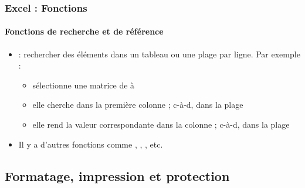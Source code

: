 \documentclass[xcolor=table, usenames,dvipsnames]{beamer}
\begin{document}
\begin{frame}
\frametitle{Excel : Fonctions}
\framesubtitle{Fonctions de recherche et de référence}

\begin{minipage}{0.69\textwidth}
	\begin{itemize}
		\item {} : rechercher des éléments dans un tableau ou une plage par ligne. Par exemple : 
		\begin{itemize}
			\item {} sélectionne une matrice de  à 
			\item elle cherche  dans la première  colonne ; c-à-d, dans la plage 
			\item elle rend la valeur correspondante dans la colonne  ; c-à-d, dans la plage 
		\end{itemize} 
		\item Il y a d'autres fonctions comme , , , etc.
	\end{itemize}
\end{minipage}
%
\begin{minipage}{0.3\textwidth} 
	
\end{minipage}

\end{frame}

\subsection{Formatage, impression et protection}
\end{document}
